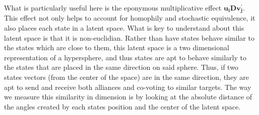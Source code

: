 What is particularly useful here is the eponymous multiplicative effect $\mathbf{u_{i}Dv^{'}_{j}}$. This effect not only helps to account for homophily and stochastic equivalence, it also places each state in a latent space. What is key to understand about this latent space is that it is non-euclidian. Rather than have states behave similar to the states which are close to them, this latent space is a two dimensional representation of a hypersphere, and thus states are apt to behave similarly to the states that are placed in the same direction on said sphere. Thus, if two states vectors (from the center of the space) are in the same direction, they are apt to send and receive both alliances and co-voting to similar targets. The way we measure this similarity in dimension is by looking at the absolute distance of the angles created by each states position and the center of the latent space. 




